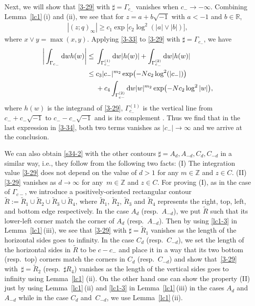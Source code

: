 \documentclass[pdftex]{sigma}
\numberwithin{equation}{section}
\def\i{\infty}
\def\R{\mathbb{R}}
\begin{document}
 Next, we will show that \eqref{3-29} with $\sharp=\Gamma_{c_-}$ vanishes when $c_-\rightarrow -\i$. Combining Lem\-ma~\ref{lc1}\,(i) and (ii), we see that
 for $z=a+b\sqrt{-1}$ with $a<-1$ and $b\in\R$,
 \begin{align}
 \label{3-33}
 |(z;q)_{\i}|\ge c_1\exp\bigl[c_2\log^2(|a|\vee |b|)\bigr],
 \end{align}
 where $x\vee y=\max(x,y)$. Applying \eqref{3-33} to
 \eqref{3-29} with $\sharp=\Gamma_{c_-}$, we have
 \begin{align}
 \bigg| \int_{\Gamma_{c_-}} {\rm d}w h(w)\bigg|
 \le{}& \int_{\Gamma^{(1)}_{c_-}}{\rm d}w |h(w)|+\int_{\Gamma^{(2)}_{c_-}}{\rm d}w |h(w)|
 \nonumber\\
\le{}& c_3 |c_-|^{m_2}\exp\bigl(-Nc_2\log^2(|c_-|)\bigr) \nonumber\\
 &+c_4\int_{\Gamma_{c-}^{(2)}} {\rm d}w |w|^{m_2}
 \exp\bigl(-Nc_2\log^2|w|\bigr),
 \label{3-34}
 \end{align}
 where $h(w)$ is the integrand of \eqref{3-29}, $\Gamma_{c_-}^{(1)}$
 is the vertical line from $c_-+c_-\sqrt{-1}$ to $c_--c_-\sqrt{-1}$ and  is its complement .
 Thus we find that in the last expression in \eqref{3-34}, both two terms vanishes as $|c_-|\rightarrow\i$ and we arrive at the conclusion.

 We can also obtain \eqref{s34-2} with the other contours $\sharp=A_d,A_{-d},C_d,C_{-d}$ in a similar way, i.e., they follow from the following two facts: (I) The integration value \eqref{3-29} does not depend on the value of $d>1$ for any $m\in\mathbb{Z}$ and $z\in C$. (II) \eqref{3-29} vanishes as $d\rightarrow\infty$ for any~${m\in\mathbb{Z}}$ and $z\in C$. For proving (I), as in the case of $\Gamma_{c-}$, we introduce a positively-oriented rectangular contour~${\tilde{R}:=\tilde{R}_1\cup\tilde{R}_2\cup\tilde{R}_3\cup\tilde{R}_4}$, where $\tilde{R}_1$, $\tilde{R}_2$, $\tilde{R}_3$ and $\tilde{R}_4$ represents the right, top, left, and bottom edge respectively. In the case $A_d$ (resp.\ $A_{-d}$), we put $\tilde{R}$ such that its lower-left corner match the corner of $A_d$ (resp.\ $A_{-d}$). Then by using \eqref{lc1-3} in Lemma~\ref{lc1}\,(iii), we see that \eqref{3-29} with $\sharp=\tilde{R}_1$ vanishes as the length of the horizontal sides goes to infinity. In the case $C_d$ (resp.~$C_{-d}$), we set the length of the horizontal sides in $\tilde{R}$ to be $c-c_-$ and place it in a way that its two bottom (resp.\ top) corners match the corners in $C_d$ (resp.\ $C_{-d}$) and show that~\eqref{3-29} with~${\sharp=\tilde{R}_2}$ (resp.\ $\sharp{R}_4$) vanishes as the length of the vertical sides goes to infinity using Lemma~\ref{lc1} (ii). On the other hand one can show the property (II) just by using Lemma~\ref{lc1}\,(ii) and \eqref{lc1-3} in Lemma~\ref{lc1}\,(iii) in the cases $A_d$ and $A_{-d}$ while in the case $C_{d}$ and~$C_{-d}$, we use Lemma~\ref{lc1}\,(ii).
\end{document}
